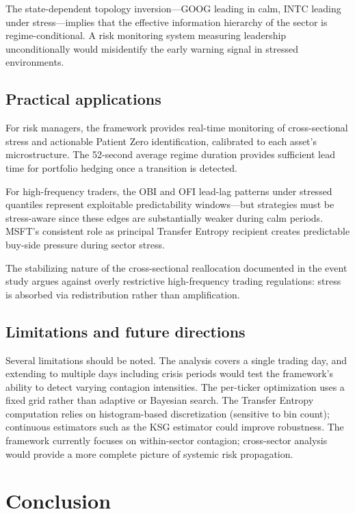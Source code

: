 \documentclass{article}
\begin{document}
The state-dependent topology inversion---GOOG leading in calm, INTC leading
under stress---implies that the effective information hierarchy of the sector is
regime-conditional. A risk monitoring system measuring leadership
unconditionally would misidentify the early warning signal in stressed
environments.

\subsection{Practical applications}

For risk managers, the framework provides real-time monitoring of
cross-sectional stress and actionable Patient Zero identification, calibrated
to each asset's microstructure. The 52-second average regime duration provides
sufficient lead time for portfolio hedging once a transition is detected.

For high-frequency traders, the OBI and OFI lead-lag patterns under stressed
quantiles represent exploitable predictability windows---but strategies must be
stress-aware since these edges are substantially weaker during calm periods.
MSFT's consistent role as principal Transfer Entropy recipient creates
predictable buy-side pressure during sector stress.

The stabilizing nature of the cross-sectional reallocation documented in the
event study argues against overly restrictive high-frequency trading
regulations: stress is absorbed via redistribution rather than amplification.

\subsection{Limitations and future directions}

Several limitations should be noted. The analysis covers a single trading day,
and extending to multiple days including crisis periods would test the
framework's ability to detect varying contagion intensities. The per-ticker
optimization uses a fixed grid rather than adaptive or Bayesian search. The
Transfer Entropy computation relies on histogram-based discretization (sensitive
to bin count); continuous estimators such as the KSG estimator could improve
robustness. The framework currently focuses on within-sector contagion;
cross-sector analysis would provide a more complete picture of systemic risk
propagation.

\section{Conclusion}
\label{sec:conclude}
\end{document}
